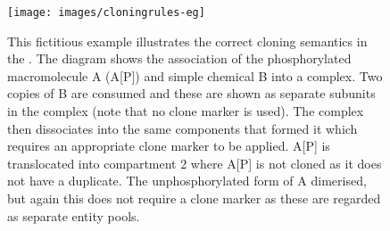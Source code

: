 \begin{figure}[htb]
  \centering
  \texttt{[image: images/cloningrules-eg]}
  \caption{This fictitious example illustrates the correct cloning semantics in
    the \PDl. The diagram shows the association of the phosphorylated
    macromolecule A (A[P]) and simple chemical B into a complex. Two
    copies of B are consumed and these are shown as separate subunits
    in the complex (note that no clone marker is used). The complex
    then dissociates into the same components that formed it which
    requires an appropriate clone marker to be applied. A[P] is
    translocated into compartment 2 where A[P] is not cloned as it
    does not have a duplicate. The unphosphorylated form of A
    dimerised, but again this does not require a clone marker as these
    are regarded as separate entity pools.}
  \label{fig:techref:cloningrules-eg}
\end{figure}




